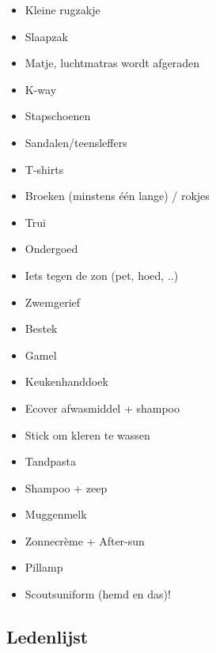 \documentclass[fleqn,10pt]{src/KampSjabloon}
\begin{document}
\begin{itemize}

\item	Kleine rugzakje
\item	Slaapzak
\item	Matje, luchtmatras wordt afgeraden
\item	K-way
\item	Stapschoenen
\item	Sandalen/teensleffers
\item	T-shirts
\item	Broeken (minstens één lange) / rokjes
\item	Trui
\item	Ondergoed
\item	Iets tegen de zon (pet, hoed, ..)
\item	Zwemgerief
\item	Bestek
\item	Gamel
\item	Keukenhanddoek
\item	Ecover afwasmiddel + shampoo 
\item	Stick om kleren te wassen
\item	Tandpasta
\item	Shampoo + zeep
\item	Muggenmelk
\item	Zonnecrème + After-sun
\item	Pillamp
\item	Scoutsuniform (hemd en das)!

\end{itemize}

\subsection{Ledenlijst}
\end{document}
